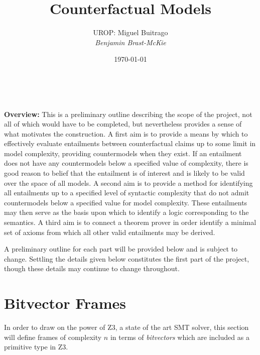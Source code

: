 \documentclass[a4paper, 11pt]{article} %
\title{\textbf{Counterfactual Models}} %
\author{\textsc{UROP:} Miguel Buitrago\\ \em Benjamin Brast-McKie} %
\date{\today} %
\makeatletter
\renewcommand{\maketitle}{ %
\begin{flushright} %
{\LARGE\@title} %

\vspace{10pt} %

{\@author} %
\\\@date %

\vspace{30pt} %
\end{flushright}
}
\makeatother
\begin{document}
\maketitle %

\thispagestyle{empty}



\noindent
\textbf{Overview:} 
This is a preliminary outline describing the scope of the project, not all of which would have to be completed, but nevertheless provides a sense of what motivates the construction.
A first aim is to provide a means by which to effectively evaluate entailments between counterfactual claims up to some limit in model complexity, providing countermodels when they exist.
If an entailment does not have any countermodels below a specified value of complexity, there is good reason to belief that the entailment is of interest and is likely to be valid over the space of all models.
A second aim is to provide a method for identifying all entailments up to a specified level of syntactic complexity that do not admit countermodels below a specified value for model complexity.
These entailments may then serve as the basis upon which to identify a logic corresponding to the semantics.
A third aim is to connect a theorem prover in order identify a minimal set of axioms from which all other valid entailments may be derived.

A preliminary outline for each part will be provided below and is subject to change.
Settling the details given below constitutes the first part of the project, though these details may continue to change throughout.






\section{Bitvector Frames}

In order to draw on the power of Z3, a state of the art SMT solver, this section will define frames of complexity $n$ in terms of \textit{bitvectors} which are included as a primitive type in Z3.
\end{document}
